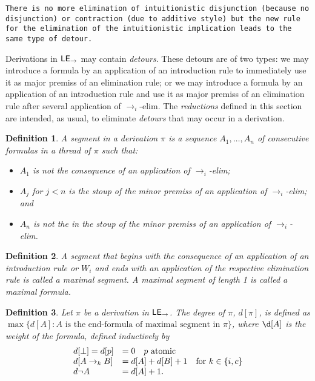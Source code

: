\documentclass{article}
\newcommand{\lei}{$\text{\sffamily{LE}}_{\to}$}
\newcommand{\efi}{$\to_i$-elim}
\newtheorem{definition}{Definition}[section]
\begin{document}
\texttt{There is no more elimination of intuitionistic disjunction (because no disjunction) or contraction (due to additive style) but the new rule for the elimination of the intuitionistic implication leads to the same type of detour.}

Derivations in \lei{} may contain \emph{detours}. These detours are of two types: we may introduce a formula by an application of an introduction rule to immediately use it as major premiss of an elimination rule; \ttfamily{}or we may introduce a formula by an application of an introduction rule and use it as major premiss of an elimination rule after several application of \efi{}.\normalfont{} The \emph{reductions} defined in this section are intended, as usual, to eliminate \emph{detours} that may occur in a derivation.

\begin{definition}
  A \emph{segment} in a derivation $\pi$ is a sequence $A_1, \dots, A_n$ of consecutive formulas in a thread of $\pi$ such that:
  \begin{itemize}
  \item $A_1$ is not the consequence of an application of \efi{};
  \item $A_j$ for $j<n$ is the stoup of the minor premiss of an application of \efi{}; and
  \item $A_n$ is not the in the stoup of the minor premiss of an application of \efi{}.
  \end{itemize}
\end{definition}

\begin{definition}
  A segment that begins with the consequence of an application of an introduction rule or $W_i$ and ends with an application of the respective elimination rule is called a \emph{maximal segment}. A maximal segment of length 1 is called a \emph{maximal formula}.
\end{definition}

\begin{definition}
  Let $\pi$ be a derivation in \lei{}. The degree of $\pi$, $d[\pi]$, is defined as $\max\{d[A]: A \text{ is the end-formula of maximal segment in }\pi\}$, where $\d[A]$ is the \emph{weight} of the formula, defined inductively by
  \[\begin{array}{l l}
      d[\bot] = d[p] &= 0\quad p\text{ atomic}\\
      d[A\to_k B] &= d[A] + d[B] + 1\quad\text{for } k\in\{i, c\}\\
      d{\neg A} &= d[A] + 1.
    \end{array}\]
\end{definition}
\end{document}
